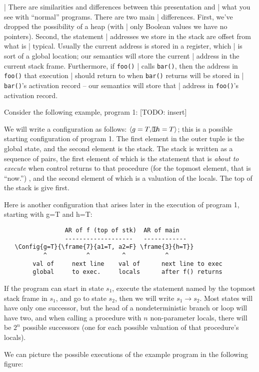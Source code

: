 \documentclass{article}
\newcommand{\Code}[1]{\texttt{#1}}
\newcommand{\Config}[2]{\ensuremath{\langle #1, #2 \rangle}}
\begin{document}
| There are similarities and differences between this presentation and
| what you see with ``normal'' programs. There are two main
| differences. First, we've dropped the possibility of a heap (with
| only Boolean values we have no pointers). Second, the statement
| addresses we store in the stack are offset from what is
| typical. Usually the current address is stored in a register, which
| is sort of a global location; our semantics will store the current
| address in the current stack frame. Furthermore, if \Code{foo()}
| calls \Code{bar()}, then the address in \Code{foo()} that execution
| should return to when \Code{bar()} returns will be stored in
| \Code{bar()}'s activation record -- our semantics will store that
| address in \Code{foo()}'s activation record.

Consider the following example, program 1:
[TODO: insert]

We will write a configuration as follows:
\Config{g=T}{\frame{1}{h=T}}; this is a possible starting
configuration of program 1. The first element in the outer tuple is
the global state, and the second element is the stack. The stack is
written as a sequence of pairs, the first element of which is the
statement that is \emph{about to execute} when control returns to that
procedure (for the topmost element, that is ``now.'') , and the second
element of which is a valuation of the locals. The top of the stack is
give first. 

Here is another configuration that arises later in the execution of
program 1, starting with g=T and h=T:

\begin{verbatim}
                 AR of f (top of stk)  AR of main
                 -------------------   ------------
   \Config{g=T}{\frame{7}{a1=T, a2=F} \frame{3}{h=T}}
           ^           ^         ^           ^
        val of     next line    val of      next line to exec
        global     to exec.     locals      after f() returns
\end{verbatim}


If the program can start in state $s_1$, execute the statement named
by the topmost stack frame in $s_1$, and go to state $s_2$, then we
will write $s_1 \rightarrow s_2$. Most states will have only one
successor, but the head of a nondeterministic branch or loop will have
two, and when calling a procedure with $n$ non-parameter locals, there
will be $2^n$ possible successors (one for each possible valuation of
that procedure's locals).

We can picture the possible executions of the example program in the
following figure:
\end{document}
